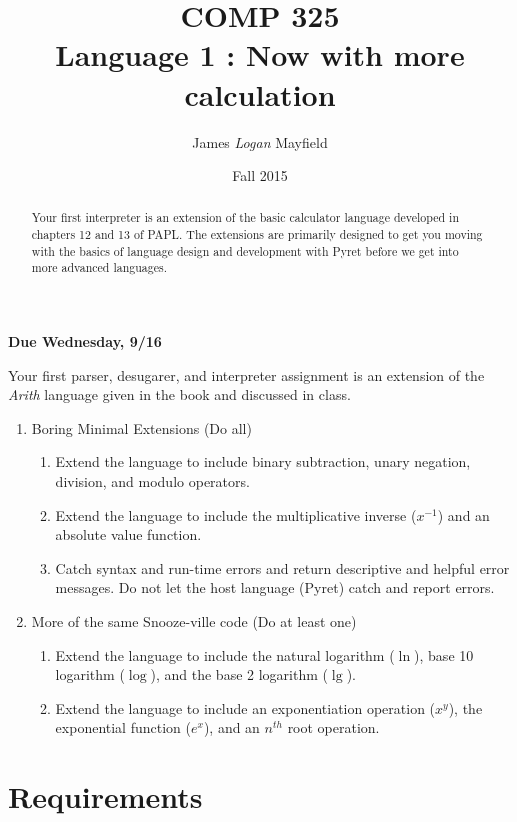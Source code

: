 \documentclass[10pt]{article}
\title{COMP 325 \\ Language 1 : Now with more calculation}
\author{ James \textit{Logan} Mayfield }
\date{Fall 2015}
\begin{document}
\maketitle
\thispagestyle{empty}

\begin{abstract}
Your first interpreter is an extension of the basic calculator language developed in chapters 12 and 13 of PAPL. The extensions are primarily designed to get you moving with the basics of language design and development with Pyret before we get into more advanced languages.
\end{abstract}

\begin{center}
\textbf{Due Wednesday, 9/16}
\end{center}

Your first parser, desugarer, and interpreter assignment is an extension of the \textit{Arith} language given in the book and discussed in class.  
\begin{enumerate}
\item Boring Minimal Extensions (Do all)
\begin{enumerate}
\item Extend the language to include binary subtraction, unary negation, division, and modulo operators.
\item Extend the language to include the multiplicative inverse ($x ^{-1}$) and an absolute value function.
\item Catch syntax and run-time errors and return descriptive and helpful error messages. Do not let the host language (Pyret) catch and report errors. 

\end{enumerate}
\item More of the same Snooze-ville code (Do at least one)
\begin{enumerate}
\item Extend the language to include the natural logarithm ($\ln$), base 10 logarithm ($\log$), and the base 2 logarithm ($\lg$).
\item Extend the language to include an exponentiation operation ($x^y$), the exponential function ($e^x$), and an $n^{th}$ root operation.
\end{enumerate}

\end{enumerate}


\section{Requirements}
\end{document}
